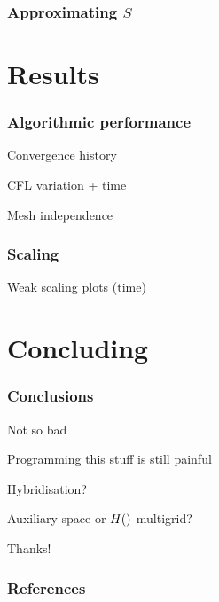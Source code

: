 \documentclass[presentation]{beamer}
\let\div\relax
\DeclareMathOperator{\div}{div}
\begin{document}
\begin{frame}
  \frametitle{Approximating $S$}
  
\end{frame}
\section{Results}

\begin{frame}[allowframebreaks]
  \frametitle{Algorithmic performance}
  Convergence history

  CFL variation + time

  Mesh independence

\end{frame}

\begin{frame}
  \frametitle{}
  
\end{frame}

\begin{frame}
  \frametitle{Scaling}
  Weak scaling plots (time)
\end{frame}


\section{Concluding}

\begin{frame}
  \frametitle{Conclusions}
  Not so bad

  Programming this stuff is still painful

  Hybridisation?

  Auxiliary space \parencite{Hiptmair:2007} or $H(\div)$ multigrid?
\end{frame}

\begin{frame}[standout]
  
  Thanks!
  
\end{frame}



  
\appendix
\begin{frame}[t, allowframebreaks]
  \frametitle{References}
  \printbibliography[heading=none]
\end{frame}
\end{document}
